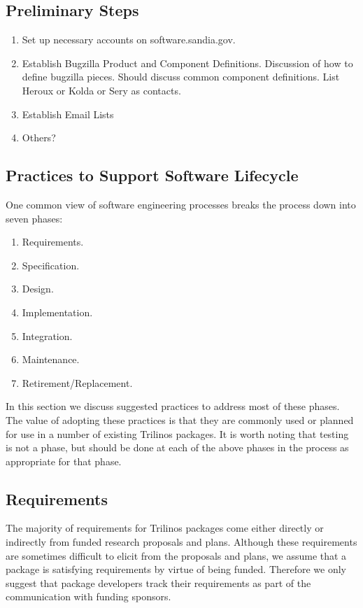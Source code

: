 \documentclass[12pt,relax]{SANDreport}
\begin{document}
\subsection{Preliminary Steps}

\begin{enumerate}
\item Set up necessary accounts on software.sandia.gov.
\item Establish Bugzilla Product and Component Definitions.
Discussion of how to define bugzilla pieces.  Should discuss common component 
definitions.  List Heroux or Kolda or Sery as contacts.
\item Establish Email Lists
\item Others?
\end{enumerate}

\subsection{Practices to Support Software Lifecycle}

One common view of software engineering processes breaks the process down into 
seven phases:
\begin{enumerate}
\item Requirements.
\item Specification.
\item Design.
\item Implementation.
\item Integration.
\item Maintenance.
\item Retirement/Replacement.
\end{enumerate}
In this section we discuss suggested practices to address most of these 
phases.  The value of adopting these practices is that they are commonly used 
or planned for use in a number of existing Trilinos packages.  It is worth 
noting that testing is not a phase, but should be done at each of the above 
phases in the process as appropriate for that phase.

\subsection{Requirements}
The majority of requirements for Trilinos packages come either directly or 
indirectly from funded research proposals and plans.  Although these 
requirements are sometimes difficult to elicit from the proposals and plans, 
we assume that a package is satisfying requirements by virtue of being 
funded.  Therefore we only suggest that package developers track their 
requirements as part of the communication with funding sponsors.
\end{document}
